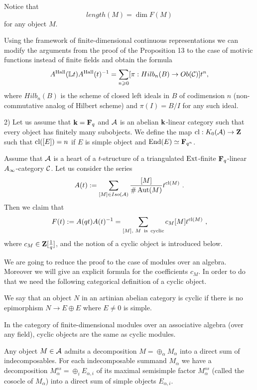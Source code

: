 \documentclass[12pt]{article}
\begin{document}
Notice that $$length(M)=\dim F(M)$$ for any object $M$. 



Using the framework of finite-dimensional continuous representations we can modify the arguments from the proof of the Proposition 13 to the case of motivic functions instead of finite fields and obtain the formula
$$A^{\operatorname{Hall}}({\mathbb L}t)A^{\operatorname{Hall}}(t)^{-1}=\sum_{n\geqslant 0}[\pi: Hilb_n(B)\to Ob({\mathcal C})]t^n,$$
where $Hilb_n(B)$ is the scheme of closed left ideals in $B$ of codimension $n$ (non-commutative analog of Hilbert scheme) and $\pi(I)=B/I$ for any such ideal.



2) Let us assume that ${\bf k}={\bf F}_q$ and ${\cal A}$ is an abelian ${\bf k}$-linear category such that every object has finitely many subobjects. We define the map $\operatorname{cl}:K_0({\cal A})\to {\bf Z}$ such that $\operatorname{cl}([E])=n$ if $E$ is simple object and
$\operatorname{End}(E)\simeq {\bf F}_{q^n}$.

\begin{prp} Assume that ${\cal A}$ is a heart of a $t$-structure of a triangulated $\operatorname{Ext}$-finite ${\bf F}_q$-linear $A_{\infty}$-category ${\mathcal C}$.
Let us consider the series
$$A(t):=\sum_{[M]\in Iso({\cal A})}{[M]\over{\#\operatorname{Aut}(M)}}t^{\operatorname{cl}(M)}\,\,.$$
Then we claim that
$$F(t):=A(qt)A(t)^{-1}=\sum_{[M],\,\, M \rm{ \,\,\,is \,\,\,cyclic}}c_M[M]t^{\operatorname{cl}(M)}\,\,,$$
where $c_M\in {\bf Z}[{1\over{q}}]$, and the notion of a cyclic object is introduced below.
\end{prp}




We are going to reduce the proof to the case of modules over an algebra. Moreover we will give an explicit formula for the coefficients $c_M$.
In order to do  that we need the following categorical definition of a cyclic object.
 
\begin{defn} We say that an object $N$  in an artinian abelian category is cyclic if there is no epimorphism
$N\to E\oplus E$ where $E\ne 0$ is simple.
\end{defn}
In the category of finite-dimensional modules over an associative algebra (over any field), cyclic objects are the same as cyclic modules.

Any object $M\in {\cal A}$ admits a decomposition $M=\oplus_{\alpha}M_{\alpha}$ into a direct sum of indecomposables.
For each indecomposable summand $M_{\alpha}$ we have  a decomposition $M_{\alpha}^{ss}=\oplus_iE_{\alpha,i}$
of its maximal semisimple factor $M_{\alpha}^{ss}$ (called the cosocle of $M_\alpha$)
into a direct sum of simple objects $E_{\alpha,i}$.
\end{document}
